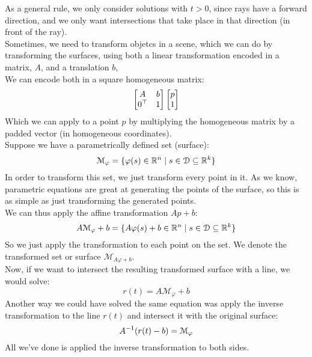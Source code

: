 \documentclass[12pt]{article}
\begin{document}
As a general rule, we only consider solutions
with $t > 0$, since rays have a forward direction,
and we only want intersections that take place
in that direction (in front of the ray). \\

Sometimes, we need to transform objetcs in a
scene, which we can do by transforming the surfaces,
using both a linear transformation encoded in
a matrix, $A$, and a translation $b$, \\
We can encode both in a square homogeneous matrix:
\[ \begin{bmatrix} A & b \\ 0^\top & 1 \end{bmatrix} \begin{bmatrix} p \\ 1 \end{bmatrix} \]
Which we can apply to a point $p$ by multiplying
the homogeneous matrix by a padded vector
(in homogeneous coordinates). \\

Suppose we have
a parametrically defined set (surface):
\[ \mathcal{M}_\varphi = 
\{ \varphi(s) \in \mathbb{R}^n \mid 
s \in \mathcal{D} \subseteq \mathbb{R}^k \} \]
In order to transform this set,
we just transform every point in it.
As we know, parametric equations are great at
generating the points of the surface,
so this is as simple as just transforming the
generated points. \\
We can thus apply the affine transformation $Ap + b$:
\[ A\mathcal{M}_\varphi + b
= \{ A\varphi(s) + b\in \mathbb{R}^n \mid 
s \in \mathcal{D} \subseteq \mathbb{R}^k \} \]
So we just apply the transformation
to each point on the set.
We denote the transformed set or surface
$\mathcal{M}_{A\varphi + b}$. \\

Now, if we want to intersect the resulting
transformed surface with a line,
we would solve:
\[ r(t) = A\mathcal{M}_\varphi + b \]
Another way we could have solved the same
equation was apply the inverse transformation
to the line $r(t)$
and intersect it with the original surface:
\[ A^{-1}(r(t) - b) = \mathcal{M}_\varphi \]
All we've done is applied the inverse transformation
to both sides. \\
\end{document}
